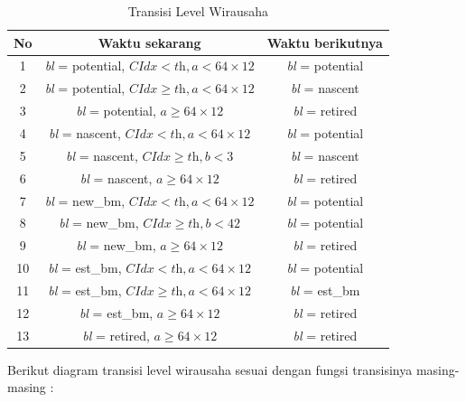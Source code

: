 	\begin{table}[H]
\centering
\caption{Transisi Level Wirausaha}
\begin{tabular}{|c|c|c|}
\hline
No & Waktu sekarang & Waktu berikutnya \\
\hline
1 & \textit{bl} = potential, $ \textit{CIdx} < \textit{th}, \textit{a} < 64 \times 12$ & \textit{bl} = potential \\
\hline
2 & \textit{bl} = potential, $\textit{CIdx} \geq \textit{th}, \textit{a} < 64 \times 12$ & \textit{bl} = nascent \\
\hline
3 & \textit{bl} = potential, $\textit{a} \geq 64 \times 12$ & \textit{bl} = retired \\
\hline
4 & \textit{bl} = nascent, $\textit{CIdx} < \textit{th}, \textit{a} <64 \times 12$ & \textit{bl} = potential \\
\hline
5 & \textit{bl} = nascent, $\textit{CIdx} \geq \textit{th}, \textit{b} < 3$ & \textit{bl} = nascent \\
\hline
6 & \textit{bl} = nascent, $\textit{a} \geq 64 \times 12$ & \textit{bl} = retired \\
\hline
7 & \textit{bl} = new\_bm, $\textit{CIdx} < \textit{th}, \textit{a} < 64 \times 12$ & \textit{bl} = potential \\
\hline
8 & \textit{bl} = new\_bm, $\textit{CIdx} \geq \textit{th}, \textit{b} < 42$ & \textit{bl} = potential \\
\hline
9 & \textit{bl} = new\_bm, $\textit{a} \geq 64 \times 12$ & \textit{bl} = retired \\
\hline
10 & \textit{bl} = est\_bm, $\textit{CIdx} < \textit{th}, \textit{a} < 64 \times 12$ & \textit{bl} = potential \\
\hline
11 & \textit{bl} = est\_bm, $\textit{CIdx} \geq \textit{th}, \textit{a} < 64 \times 12$ & \textit{bl} = est\_bm \\
\hline
12 & \textit{bl} = est\_bm, $\textit{a} \geq 64 \times 12$ & \textit{bl} = retired \\
\hline
13 & \textit{bl} = retired, $\textit{a} \geq 64 \times 12$ & \textit{bl} = retired \\
\hline
\end{tabular}
\label{tabelLW}
\end{table}

Berikut diagram transisi level wirausaha sesuai dengan fungsi transisinya masing-masing :

